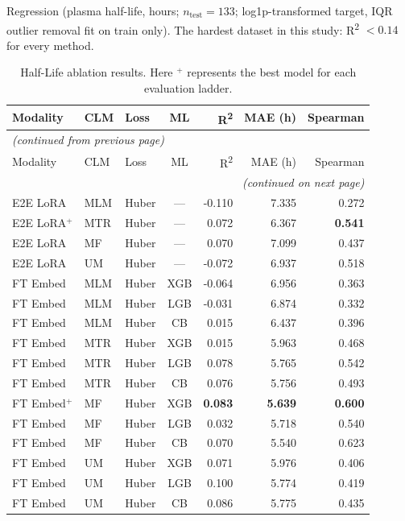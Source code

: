 \documentclass[9pt,a4paper]{article}
\begin{document}
Regression (plasma half-life, hours; $n_\text{test}=133$; log1p-transformed target,
IQR outlier removal fit on train only). The hardest dataset in this study: R\textsuperscript{2}
$<0.14$ for every method.

\begin{scriptsize}
\begin{longtable}{lllcrrr}
\caption{Half-Life ablation results. Here $^+$ represents the best model for each evaluation ladder.}
\label{tab:s8_halflife} \\
\toprule
Modality & CLM & Loss & ML & R\textsuperscript{2} & MAE (h) & Spearman \\
\midrule
\endfirsthead
\multicolumn{7}{l}{\footnotesize\textit{(continued from previous page)}} \\
\toprule
Modality & CLM & Loss & ML & R\textsuperscript{2} & MAE (h) & Spearman \\
\midrule
\endhead
\midrule
\multicolumn{7}{r}{\footnotesize\textit{(continued on next page)}} \\
\endfoot
\bottomrule
\endlastfoot
E2E LoRA & MLM & Huber & --- & -0.110 & 7.335 & 0.272 \\
E2E LoRA$^+$ & MTR & Huber & --- & 0.072 & 6.367 & \textbf{0.541} \\
E2E LoRA & MF  & Huber & --- & 0.070 & 7.099 & 0.437 \\
E2E LoRA & UM  & Huber & --- & -0.072 & 6.937 & 0.518 \\
\midrule
FT Embed & MLM & Huber & XGB & -0.064 & 6.956 & 0.363 \\
FT Embed & MLM & Huber & LGB & -0.031 & 6.874 & 0.332 \\
FT Embed & MLM & Huber & CB  & 0.015 & 6.437 & 0.396 \\
FT Embed & MTR & Huber & XGB & 0.015 & 5.963 & 0.468 \\
FT Embed & MTR & Huber & LGB & 0.078 & 5.765 & 0.542 \\
FT Embed & MTR & Huber & CB  & 0.076 & 5.756 & 0.493 \\
FT Embed$^+$ & MF & Huber & XGB & \textbf{0.083} & \textbf{5.639} & \textbf{0.600} \\
FT Embed & MF  & Huber & LGB & 0.032 & 5.718 & 0.540 \\
FT Embed & MF  & Huber & CB  & 0.070 & 5.540 & 0.623 \\
FT Embed & UM  & Huber & XGB & 0.071 & 5.976 & 0.406 \\
FT Embed & UM  & Huber & LGB & 0.100 & 5.774 & 0.419 \\
FT Embed & UM  & Huber & CB  & 0.086 & 5.775 & 0.435 \\

\end{longtable}
\end{scriptsize}
\end{document}
